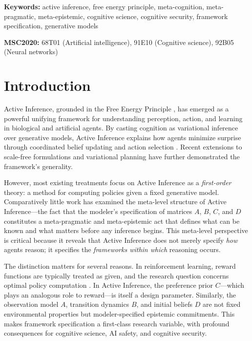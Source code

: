 \documentclass[
]{article}
\begin{document}
\textbf{Keywords:} active inference, free energy principle,
meta-cognition, meta-pragmatic, meta-epistemic, cognitive science,
cognitive security, framework specification, generative models

\textbf{MSC2020:} 68T01 (Artificial intelligence), 91E10 (Cognitive
science), 92B05 (Neural networks)

\newpage

\section{Introduction}\label{sec:introduction}

Active Inference, grounded in the Free Energy Principle
\cite{friston2010free}, has emerged as a powerful unifying framework for
understanding perception, action, and learning in biological and
artificial agents. By casting cognition as variational inference over
generative models, Active Inference explains how agents minimize
surprise through coordinated belief updating and action selection
\cite{friston2015active, parr2022active}. Recent extensions to
scale-free formulations \cite{friston2025scalefree} and variational
planning \cite{champion2025efeplanning} have further demonstrated the
framework's generality.

However, most existing treatments focus on Active Inference as a
\emph{first-order} theory: a method for computing policies given a fixed
generative model. Comparatively little work has examined the meta-level
structure of Active Inference---the fact that the modeler's
specification of matrices \(A\), \(B\), \(C\), and \(D\) constitutes a
meta-pragmatic and meta-epistemic act that defines what can be known and
what matters before any inference begins. This meta-level perspective is
critical because it reveals that Active Inference does not merely
specify \emph{how} agents reason; it specifies the \emph{frameworks
within which} reasoning occurs.

The distinction matters for several reasons. In reinforcement learning,
reward functions are typically treated as given, and the research
question concerns optimal policy computation \cite{sajid2022active}. In
Active Inference, the preference prior \(C\)---which plays an analogous
role to reward---is itself a design parameter. Similarly, the
observation model \(A\), transition dynamics \(B\), and initial beliefs
\(D\) are not fixed environmental properties but modeler-specified
epistemic commitments. This makes framework specification a first-class
research variable, with profound consequences for cognitive science, AI
safety, and cognitive security.
\end{document}
